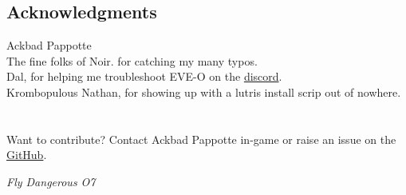 \documentclass{article}
\begin{document}
\clearpage
\subsection*{Acknowledgments}
Ackbad Pappotte\\
The fine folks of Noir. for catching my many typos.\\
Dal, for helping me troubleshoot EVE-O on the \href{https://discord.gg/xYt8R9AFXB}{discord}. \\
Krombopulous Nathan, for showing up with a lutris install scrip out of nowhere. \\
\\
\\
Want to contribute? Contact Ackbad Pappotte in-game or raise an issue on the \href{https://github.com/AckbadP/eve-multi-guide}{GitHub}.  
\\



\clearpage
\begin{center}
  \vspace*{\fill}
  \textsl{\large \ttfamily Fly Dangerous O7}
  \vspace*{\fill}
\end{center}
\end{document}
